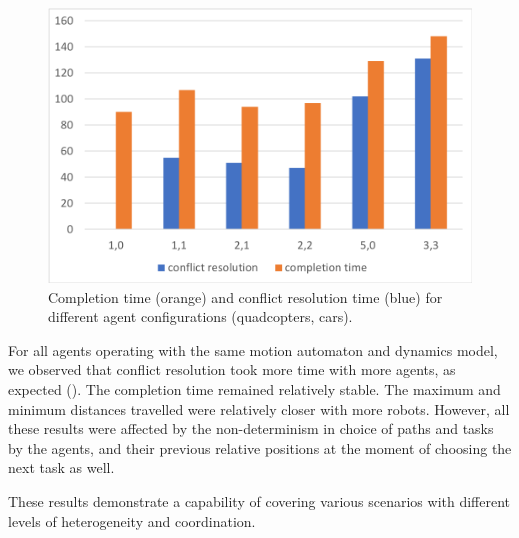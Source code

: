 \begin{figure}
\includegraphics[scale=0.3]{figs/completion.png}\hfill
\caption{\small Completion time (orange) and conflict resolution time (blue)  for different agent configurations (quadcopters, cars). }
\label{fig:completionstats}
\end{figure}

 For all agents operating with the same motion automaton and dynamics model, we observed that conflict resolution took more time with more agents, as expected (). The completion time remained relatively stable. The maximum and minimum distances travelled were relatively closer with more robots. However, all these results were affected by the non-determinism in choice of paths and tasks by the agents, and their previous relative positions at the moment of choosing the next task as well. 
 


These results demonstrate a capability of covering various scenarios with different levels of heterogeneity and coordination.
 
